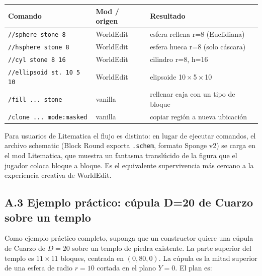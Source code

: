 \documentclass[12pt,a4paper]{scrartcl}
\newcommand{\code}[1]{\texttt{\small #1}}
\newcommand{\cmd}[1]{\textcolor{earth}{\texttt{\small #1}}}
\begin{document}
\vspace{0.4em}
\begin{center}
\small
\begin{tabularx}{\textwidth}{@{}llX@{}}
\toprule
\textbf{Comando} & \textbf{Mod / origen} & \textbf{Resultado} \\
\midrule
\cmd{//sphere stone 8}     & WorldEdit & esfera rellena r=8 (Euclidiana)  \\
\cmd{//hsphere stone 8}    & WorldEdit & esfera hueca r=8 (solo cáscara)  \\
\cmd{//cyl stone 8 16}     & WorldEdit & cilindro r=8, h=16  \\
\cmd{//ellipsoid st. 10 5 10} & WorldEdit & elipsoide 10\,$\times$\,5\,$\times$\,10  \\
\cmd{/fill ... stone}      & vanilla & rellenar caja con un tipo de bloque  \\
\cmd{/clone ... mode:masked} & vanilla & copiar región a nueva ubicación  \\
\bottomrule
\end{tabularx}
\end{center}

Para usuarios de Litematica el flujo es distinto: en lugar de ejecutar comandos, el archivo schematic (Block Round exporta \code{.schem}, formato Sponge v2) se carga en el mod Litematica, que muestra un fantasma translúcido de la figura que el jugador coloca bloque a bloque. Es el equivalente supervivencia más cercano a la experiencia creativa de WorldEdit.

\subsection*{A.3 Ejemplo práctico: cúpula D=20 de Cuarzo sobre un templo}
Como ejemplo práctico completo, suponga que un constructor quiere una cúpula de Cuarzo de $D=20$ sobre un templo de piedra existente. La parte superior del templo es $11 \times 11$ bloques, centrada en $(0,80,0)$. La cúpula es la mitad superior de una esfera de radio $r=10$ cortada en el plano $Y=0$. El plan es:
\end{document}
